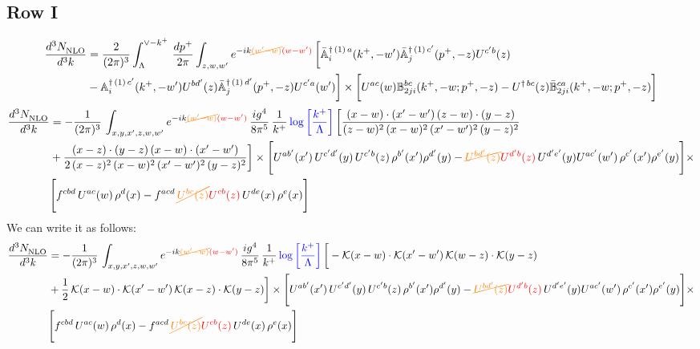 \documentclass[9pt]{article}
\def\mf#1{\mathbb{#1}}
\numberwithin{equation}{section}
\begin{document}
\subsection{Row I}
\begin{align}
 \frac{d^{3}N_{\rm NLO}^{\rm}}{d^{3}k}  & =    \frac{2}{(2\pi)^{3}} \int_{\Lambda}^{\vee - k^{+}}\, \frac{dp^{+}}{2\pi}\int_{z,w,w^{\prime}} e^{-ik{\color{orange}\cancel{(w^{\prime}-w)}}{\color{red}(w-w^{\prime})}}\, 
        \bigg[\Bar{\mf{A}}^{\dagger\, (1)\, a}_{i}(k^{+},-w^{\prime})\Bar{\mf{A}}^{\dagger\, (1)\, c^{\prime}}_{j}(p^{+},-z)U^{c^{\prime}b}(z)\notag \\ & -\mf{A}^{\dagger\, (1)\, c^{\prime}}_{i}(k^{+},- w^{\prime})U^{bd^{\prime}}(z)\Bar{\mf{A}}^{\dagger\, (1)\, d^{\prime}}_{j}(p^{+},-z)U^{c^{\prime}a}(w^{\prime})  \bigg]\times \bigg[U^{ac}(w) \mf{B}^{bc}_{2ji}(k^{+},-w;p^{+},-z) -U^{\dagger\, bc}(z)\Bar{\mf{B}}^{ca}_{2ji}(k^{+},-w; p^{+},-z)\bigg] \nonumber
\end{align}
\begin{align}
    \frac{d^{3}N_{\rm NLO}^{\rm}}{d^{3}k}  & = -\frac{1}{(2\pi)^{3}}\, \int_{x,y,x',z,w,w^{\prime}} e^{-ik{\color{orange}\cancel{(w^{\prime}-w)}}{\color{red}(w-w^{\prime})}}\,\frac{ig^{4}}{8\pi^{5}}\,\frac{1}{k^{+}}\,{\color{blue}\log{\left[\frac{k^{+}}{\Lambda}\right]}}\,\bigg[\frac{(x-w)\cdot (x'-w')\,(z-w)\cdot (y-z)}{(z-w)^{2}\,(x-w)^{2}\,(x'-w')^{2}\,(y-z)^{2}}\notag \\ & +\frac{(x-z)\cdot (y-z)\,(x-w)\cdot (x'-w')}{2\,(x-z)^{2}\, (x-w)^{2}\,(x'-w')^{2}\,(y-z)^{2}}\bigg]\times  \Bigg[U^{ab'}(x')\,U^{c'd'}(y)\,U^{c'b}(z)\,\rho^{b'}(x')\rho^{d'}(y)-{\color{orange}\cancel{U^{bd'}(z)}}{\color{red}U^{d'b}(z)}\,U^{d'e'}(y)U^{ac'}(w')\,\rho^{c'}(x')\rho^{e'}(y)\Bigg]\times\notag \\ & \Bigg[f^{cbd}\,U^{ac}(w)\,\rho^{d}(x)-f^{acd}\, {\color{orange}\cancel{U^{bc}(z)}}{\color{red}U^{cb}(z)}\,U^{de}(x)\,\rho^{e}(x)\Bigg] 
\end{align}
We can write it as follows: 
\begin{align}
    \frac{d^{3}N_{\rm NLO}^{\rm}}{d^{3}k}  & = -\frac{1}{(2\pi)^{3}}\, \int_{x,y,x',z,w,w^{\prime}} e^{-ik{\color{orange}\cancel{(w^{\prime}-w)}}{\color{red}(w-w^{\prime})}}\,\frac{ig^{4}}{8\pi^{5}}\,\frac{1}{k^{+}}\,{\color{blue}\log{\left[\frac{k^{+}}{\Lambda}\right]}}\,\bigg[-\mathcal{K}(x-w)\cdot \mathcal{K}(x'-w')\, \mathcal{K}(w-z)\cdot \mathcal{K}(y-z)\notag \\ & +\frac{1}{2}\,\mathcal{K}(x-w)\cdot \mathcal{K}(x'-w')\, \mathcal{K}(x-z)\cdot \mathcal{K}(y-z)\bigg]\times  \Bigg[U^{ab'}(x')\,U^{c'd'}(y)\,U^{c'b}(z)\,\rho^{b'}(x')\rho^{d'}(y)-{\color{orange}\cancel{U^{bd'}(z)}}{\color{red}U^{d'b}(z)}\,U^{d'e'}(y)U^{ac'}(w')\,\rho^{c'}(x')\rho^{e'}(y)\Bigg]\times\notag \\ & \Bigg[f^{cbd}\,U^{ac}(w)\,\rho^{d}(x)-f^{acd}\, {\color{orange}\cancel{U^{bc}(z)}}{\color{red}U^{cb}(z)}\,U^{de}(x)\,\rho^{e}(x)\Bigg] 
\end{align}
\end{document}
